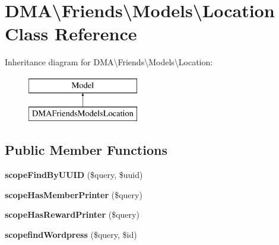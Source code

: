 \hypertarget{classDMA_1_1Friends_1_1Models_1_1Location}{\section{D\+M\+A\textbackslash{}Friends\textbackslash{}Models\textbackslash{}Location Class Reference}
\label{classDMA_1_1Friends_1_1Models_1_1Location}
}
Inheritance diagram for D\+M\+A\textbackslash{}Friends\textbackslash{}Models\textbackslash{}Location\+:\begin{figure}[H]
\begin{center}
\leavevmode
\includegraphics[height=2.000000cm]{d6/df9/classDMA_1_1Friends_1_1Models_1_1Location}
\end{center}
\end{figure}
\subsection*{Public Member Functions}
\begin{DoxyCompactItemize}
\item 
\hypertarget{classDMA_1_1Friends_1_1Models_1_1Location_a9497c29c40152b277d6cfcafce691f25}{{\bfseries scope\+Find\+By\+U\+U\+I\+D} (\$query, \$uuid)}\label{classDMA_1_1Friends_1_1Models_1_1Location_a9497c29c40152b277d6cfcafce691f25}

\item 
\hypertarget{classDMA_1_1Friends_1_1Models_1_1Location_a44e45661138474dbe8a215ba477a8237}{{\bfseries scope\+Has\+Member\+Printer} (\$query)}\label{classDMA_1_1Friends_1_1Models_1_1Location_a44e45661138474dbe8a215ba477a8237}

\item 
\hypertarget{classDMA_1_1Friends_1_1Models_1_1Location_a4f3819ea49bbdfbd3309a926fbb04d95}{{\bfseries scope\+Has\+Reward\+Printer} (\$query)}\label{classDMA_1_1Friends_1_1Models_1_1Location_a4f3819ea49bbdfbd3309a926fbb04d95}

\item 
\hypertarget{classDMA_1_1Friends_1_1Models_1_1Location_ad8b1171d787276f812889f20a6916e15}{{\bfseries scopefind\+Wordpress} (\$query, \$id)}\label{classDMA_1_1Friends_1_1Models_1_1Location_ad8b1171d787276f812889f20a6916e15}

\end{DoxyCompactItemize}
